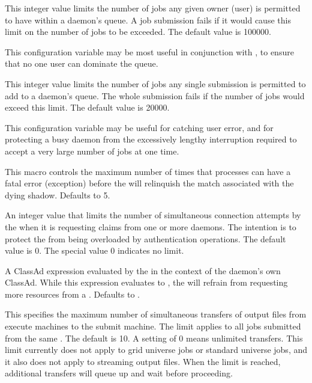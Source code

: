 \begin{description}
\label{param:MaxJobsPerOwner}
\item[\Macro{MAX\_JOBS\_PER\_OWNER}]
  This integer value limits the number of jobs any given owner (user) is
  permitted to have within a  daemon's queue.  
  A job submission fails if it would cause this limit on the number of
  jobs to be exceeded. 
  The default value is 100000.

  This configuration variable may be most useful in conjunction with
 ,
  to ensure that no one user can dominate the queue.

\label{param:MaxJobsPerSubmission}
\item[\Macro{MAX\_JOBS\_PER\_SUBMISSION}]
  This integer value limits the number of jobs any single submission
  is permitted to add to a  daemon's queue.  The
  whole submission fails if the number of jobs would exceed this limit.
  The default value is 20000.

  This configuration variable may be useful for catching user error,
  and for protecting a busy  daemon
  from the excessively lengthy interruption
  required to accept a very large number of jobs at one time.

\label{param:MaxShadowExceptions}
\item[\Macro{MAX\_SHADOW\_EXCEPTIONS}]
  This macro controls the maximum
  number of times that  processes can have a fatal
  error (exception) before the  will relinquish
  the match associated with the dying shadow.  Defaults to 5.

\label{param:MaxPendingStartdContacts}
\item[\Macro{MAX\_PENDING\_STARTD\_CONTACTS}]
  An integer value that limits
  the number of simultaneous connection attempts by the 
  when it is requesting claims from one or more  daemons.
  The intention is to protect the  from being overloaded
  by authentication operations.  The default value is 0.
  The special value 0 indicates no limit.

\label{param:CurbMatchmaking}
\item[\Macro{CURB\_MATCHMAKING}]
  A ClassAd expression evaluated by the  in the context of the
   daemon's own ClassAd.  
  While this expression evaluates to , the
   will refrain from requesting more resources from a
  .  Defaults to .

\label{param:MaxConcurrentDownloads}
\item[\Macro{MAX\_CONCURRENT\_DOWNLOADS}]
  This specifies the maximum
  number of simultaneous transfers of output files from execute
  machines to the submit machine.  The limit applies to all jobs
  submitted from the same .  The default is 10.  A
  setting of 0 means unlimited transfers.  This limit currently does
  not apply to grid universe jobs or standard universe jobs, and it
  also does not apply to streaming output files.  When the limit is
  reached, additional transfers will queue up and wait before
  proceeding.


\end{description}
